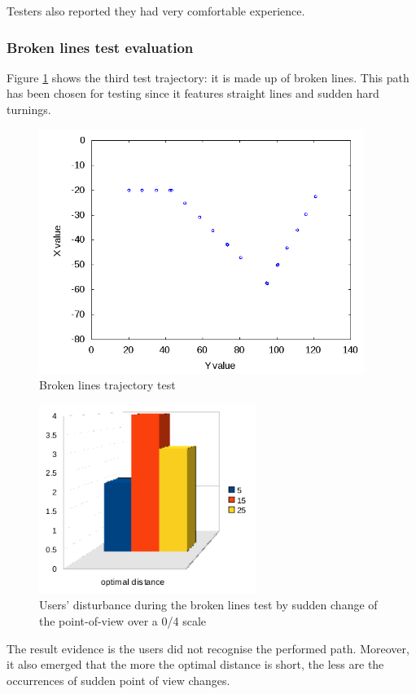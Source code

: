 %
Testers also reported they had very comfortable experience.


\subsubsection{Broken lines test evaluation}
\label{subsubsec:zigzagtest}
Figure \ref{fig:zigzagtest} shows the third test trajectory:
it is made up of broken lines. This path has been chosen for testing
since it features straight lines and sudden hard turnings.
%
\begin{figure}[!h]
  \begin{center}
    \includegraphics[width=300pt]{img/path_session_6.png}
    \caption{Broken lines trajectory test}
    \label{fig:zigzagtest}
  \end{center}
\end{figure}
%

\begin{figure}[!h]
  \begin{center}
    \includegraphics[width=200pt]{img/zz_results.png}
    \caption{Users' disturbance during the broken lines test 
      by sudden change of the point-of-view over a 0/4 scale}
  \end{center}
\end{figure}
%
The result evidence is the users did not recognise the performed path.
Moreover, it also emerged that the more the optimal distance is short,
the less are the occurrences of sudden point of view changes.
%


